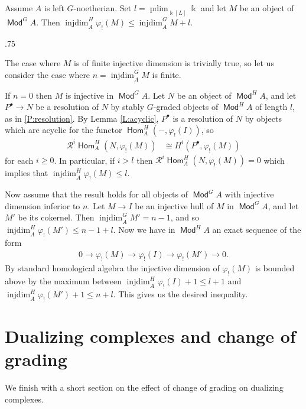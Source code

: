 \documentclass[11pt,fleqn]{article}
\makeatletter
\renewenvironment{proof}[1][\textit{Proof}]{\par
  \pushQED{\qed}%
  \normalfont \topsep.75\paraskip\relax
  \trivlist
  \item[\hskip\labelsep
        \itshape
    #1\@addpunct{.}]\ignorespaces
}{%
  \popQED\endtrivlist\@endpefalse
}
\renewcommand\to{\longrightarrow}
\renewcommand\phi{\varphi}
\renewcommand\k{\Bbbk}
\newcommand\R{\mathcal R}
\DeclareMathOperator\Mod{\mathsf{Mod}}
\DeclareMathOperator\Hom{\mathsf{Hom}}
\DeclareMathOperator\injdim{injdim}
\DeclareMathOperator\projdim{pdim}
\makeatother
\begin{document}
\begin{Theorem}
\label{T:main-theorem}
Assume $A$ is left $G$-noetherian.
Set $l = \projdim_{\k[L]} \k$ and let $M$ be an object of $\Mod^G A$. Then 
$\injdim^H_A \phi_!(M) \leq \injdim^G_A M + l$.
\end{Theorem}
\begin{proof}
The case where $M$ is of finite injective dimension is trivially true, so let
us consider the case where $n = \injdim_A^G M$ is finite. 

If $n = 0$ then $M$ is injective in $\Mod^G A$. Let $N$ be an object of 
$\Mod^H A$, and let $P^\bullet \to N$ be a resolution of $N$ by stably 
$G$-graded objects of $\Mod^H A$ of length $l$, as in \ref{P:resolution}.
By Lemma \ref{L:acyclic}, $P^\bullet$ is a resolution of $N$ by objects which 
are acyclic for the functor $\Hom_A^H(-,\phi_!(I))$, so 
\begin{align*}
\R^i\Hom_A^H(N, \phi_!(M)) 
  &\cong H^i(P^\bullet, \phi_!(M))
\end{align*}
for each $i \geq 0$. In particular, if $i > l$ then $\R^i\Hom_A^H(N, 
\phi_!(M)) = 0$ which implies that $\injdim_A^H \phi_!(M) \leq l$.

Now assume that the result holds for all objects of $\Mod^G A$ with
injective dimension inferior to $n$. Let $M \to I$ be an injective hull
of $M$ in $\Mod^G A$, and let $M'$ be its cokernel. Then $\injdim^G_A M' = 
n-1$, and so $\injdim^H_A \phi_!(M') \leq n-1+l$. Now we have in $\Mod^H A$
an exact sequence of the form
\begin{align*}
0 \to \phi_!(M) \to \phi_!(I) \to \phi_!(M')  \to 0.
\end{align*}
By standard homological algebra the injective dimension of $\phi_!(M)$ is 
bounded above by the maximum between $\injdim_A^H \phi_!(I) + 1 \leq l+1$ and 
$\injdim_A^H \phi_!(M') + 1 \leq n+l$. This gives us the desired inequality.
\end{proof}


\section{Dualizing complexes and change of grading}
We finish with a short section on the effect of change of grading on dualizing
complexes. 
\end{document}
